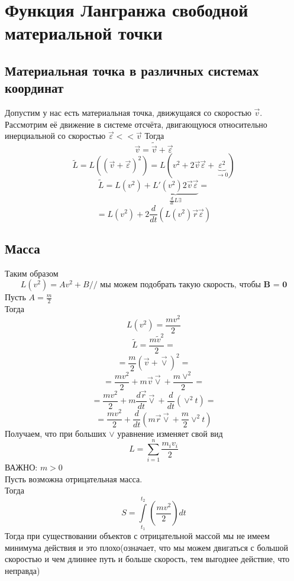 \documentclass[a4paper, 12pt, titlepage, fleqn]{article}
\newcommand{\T}{\textbf}
\begin{document}
 	\section{Функция Лангранжа свободной материальной точки}
	 	\subsection{Материальная точка в различных системах координат}
		 	Допустим у нас есть материальная точка, движущаяся со скоростью $\vec{v}$. Рассмотрим её движение в системе отсчёта, двигающуюся относительно инерциальной со скоростью $\vec{\varepsilon} << \vec{v}$
		 	Тогда
		 	\[
			 	\vec{v} = \tilde{\vec{v}} + \vec{\varepsilon}
		 	\] 
		 	\[
			 	\tilde{L} = L((\vec{v} + \vec{\varepsilon})^2) = L(v^2 + 2\vec{v}\vec{\varepsilon} + \underbrace{\varepsilon^2}_{\to 0})
		 	\]
		 	\[
			 	\tilde{L} = L(v^2) + \underbrace{L'(v^2)2\vec{v}\vec{\varepsilon}}_{\frac{d}{dt}L \exists} =
		 	\]
		 	\[
				= L(v^2) + 2\frac{d}{dt}(L(v^2)\vec{r}\vec{\varepsilon})
		 	\]
		 \subsection{Масса}
		 	Таким образом 
		 	\[
			 	L(v^2) = Av^2 + B //\T{ мы можем подобрать такую скорость, чтобы B = 0}
		 	\]
		 	Пусть $A = \frac{m}{2}$\\
		 	Тогда 
		 	\[
			 	L(v^2) = \frac{mv^2}{2}
		 	\]
		 	\[
			 	\tilde{L} = \frac{m\tilde{v}^2}{2} = 
			\] 	
			\[
			 	 = \frac{m}{2}(\vec{v} + \vec{\vee})^2 =
			\]
			\[
			 	 = \frac{mv^2}{2} + m\vec{v}\vec{\vee} + \frac{m\vee^2}{2} =
		 	\]
		 	\[
			 	= \frac{mv^2}{2} + m\frac{d\vec{r}}{dt}\vec{\vee} + \frac{d}{dt}(\vee^2t) =
		 	\]
		 	\[
			 	= \frac{mv^2}{2} + \frac{d}{dt}(m\vec{r}\vec{\vee} + \frac{m}{2}\vee^2t)
		 	\]
		 	Получаем, что при больших $\vee$ уравнение изменяет свой вид
		 	\[
				L = \sum\limits_{i = 1}^{n}\frac{m_i v_i}{2}
		 	\]
		 	ВАЖНО: $m > 0$\\
		 	Пусть возможна отрицательная масса.\\
		 	Тогда 
		 	\[
			 	S = \int\limits_{t_1}^{t_2}\left(\frac{mv^2}{2}\right)dt
		 	\]
		 	Тогда при существовании объектов с отрицательной массой мы не имеем минимума действия и это плохо(означает, что мы можем двигаться с большой скоростью и чем длиннее путь и больше скорость, тем выгоднее действие, что неправда)\\
		 	
\end{document}
